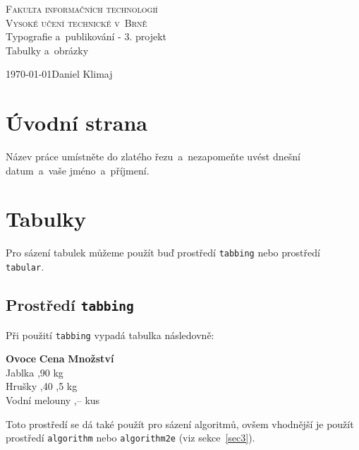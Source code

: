 \documentclass[a4paper,11pt]{article}
\begin{document}
\begin{titlepage}

\begin{center}
\Huge
\textsc{Fakulta informačních technologií \\
Vysoké učení technické v~Brně} \\
\LARGE
Typografie a~publikování - 3. projekt \\
\Huge Tabulky a~obrázky
\end{center}
{\LARGE \today \hfill Daniel Klimaj}
\end{titlepage}

\section{Úvodní strana}
Název práce umístněte do zlatého řezu~a~nezapomeňte uvést dnešní datum~a~vaše jméno~a~příjmení.

\section{Tabulky}
Pro sázení tabulek můžeme použít buď prostředí \textup{\texttt{tabbing}} nebo prostředí \textup{\texttt{tabular}}.

\subsection{Prostředí \textup{\texttt{tabbing}}}
Při použití \textup{\texttt{tabbing}} vypadá tabulka následovně:
\begin{tabbing}
\textbf{Ovoce} \hspace{1.5cm} \= \textbf{Cena} \hspace{0.25cm} \= \textbf{Množství} \\
Jablka ,90  kg \\
Hrušky ,40 ,5 kg \\
Vodní melouny ,--  kus \\
\end{tabbing}
Toto prostředí se dá také použít pro sázení algoritmů, ovšem vhodnější je použít prostředí \textup{\texttt{algorithm}} nebo \textup{\texttt{algorithm2e}} (viz sekce~\ref{sec3}).
\end{document}
